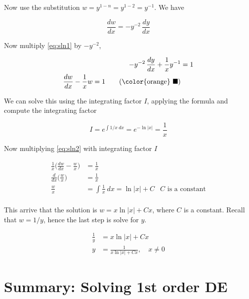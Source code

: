 \begin{solution}
\begin{enumerate}
            Now use the substitution $w = y^{1-n} = y^{1-2} = y^{-1}$. We have 

            \begin{equation}
                \frac{dw}{dx} = -y^{-2}\, \frac{dy}{dx}
            \end{equation}

            Now multiply \eqref{eq:sln1} by $-y^{-2}$, 

            \begin{align*}
                -y^{-2}\, \frac{dy}{dx} + \frac{1}{x}y^{-1} &= 1\\
                \frac{dw}{dx} - \frac{1}{x} w = 1 \label{eq:sln2} \tag{{\color{orange} $\blacksquare$}}
            \end{align*}

            We can solve this using the integrating factor $I$, applying the formula and compute 
            the integrating factor

            \begin{equation}
                I = e^{\int 1/x \> dx} = e^{-\ln |x|} = \frac{1}{x}
            \end{equation}

            Now multiplying \eqref{eq:sln2} with integrating factor $I$

            \begin{align*}
                \frac{1}{x} \biggl(\frac{dw}{dx} - \frac{w}{x} \biggr) &= \frac{1}{x}\\
                \frac{d}{dx} \biggl( \frac{w}{x}\biggr) &= \frac{1}{x}\\
                \frac{w}{x} &= \int \frac{1}{x} \> dx = \ln |x| + C & C \text{ is a constant}\\
            \end{align*}

            This arrive that the solution is $w = x \ln |x| + Cx$, where $C$ is a constant. Recall 
            that $w = 1/y$, hence the last step is solve for $y$.

            \begin{align*}
                \frac{1}{y} &= x \ln |x| + Cx\\
                y &= \frac{1}{x \ln |x| + Cx},\quad  x \neq 0
            \end{align*}
    \end{enumerate}
\end{solution}

\section*{Summary: Solving 1st order DE}

